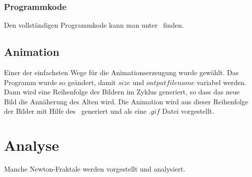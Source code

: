 \documentclass[a4paper,12pt]{llncs}
\numberwithin{equation}{section}
\begin{document}
\subsubsection{Programmkode}
Den vollständigen Programmkode kann man unter~\cite{source} finden.

\subsection{Animation}\label{subs:vis:anime}
Einer der einfachsten Wege für die Animationserzeugung wurde gewählt. 
Das Programm wurde so geändert, damit $size$ und $outputfilename$ variabel werden. 
Dann wird eine Reihenfolge der Bildern im Zyklus generiert, so dass das neue Bild die Annäherung des Alten wird.
Die Animation wird aus dieser Reihenfolge der Bilder mit Hilfe des~\cite{animegen} generiert und als eine .$gif$ Datei vorgestellt.

\section{Analyse}\label{sec:analy}
Manche Newton-Fraktale werden vorgestellt und analysiert.
\end{document}
